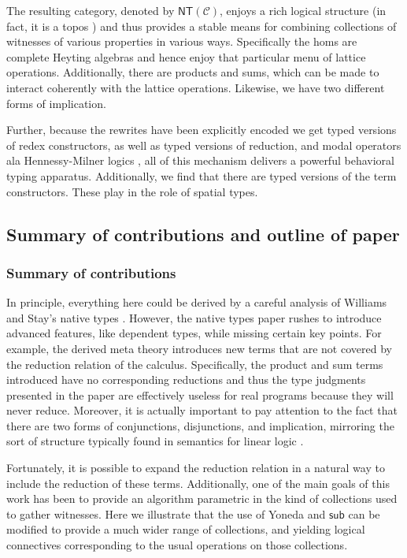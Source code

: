 The resulting category, denoted by $\mathsf{NT}(\mathcal{C})$, enjoys
a rich logical structure (in fact, it is a topos
\cite{DBLP:books/daglib/0067551}) and thus provides a stable means for
combining collections of witnesses of various properties in various
ways. Specifically the homs are complete Heyting algebras and hence
enjoy that particular menu of lattice operations. Additionally, there
are products and sums, which can be made to interact coherently with
the lattice operations. Likewise, we have two different forms of
implication.

Further, because the rewrites have been explicitly encoded we get
typed versions of redex constructors, as well as typed versions of
reduction, and modal operators ala Hennessy-Milner logics
\cite{milner91polyadicpi}, all of this mechanism delivers a powerful
behavioral typing apparatus. Additionally, we find that there are
typed versions of the term constructors. These play in the role of
spatial types.

\subsection{Summary of contributions and outline of paper}

\subsubsection{Summary of contributions}
In principle, everything here could be derived by a careful analysis
of Williams and Stay's native types
\cite{DBLP:journals/corr/abs-2102-04672}. However, the native types
paper rushes to introduce advanced features, like dependent types,
while missing certain key points. For example, the derived meta theory
introduces new terms that are not covered by the reduction relation of
the calculus. Specifically, the product and sum terms introduced have
no corresponding reductions and thus the type judgments presented in
the paper are effectively useless for real programs because they will
never reduce. Moreover, it is actually important to pay attention to
the fact that there are two forms of conjunctions, disjunctions, and
implication, mirroring the sort of structure typically found in
semantics for linear logic \cite{DBLP:journals/tcs/Abramsky93}.

Fortunately, it is possible to expand the reduction relation in a
natural way to include the reduction of these terms. Additionally, one
of the main goals of this work has been to provide an algorithm
parametric in the kind of collections used to gather witnesses. Here
we illustrate that the use of Yoneda and $\mathsf{sub}$ can be
modified to provide a much wider range of collections, and yielding
logical connectives corresponding to the usual operations on those
collections.

